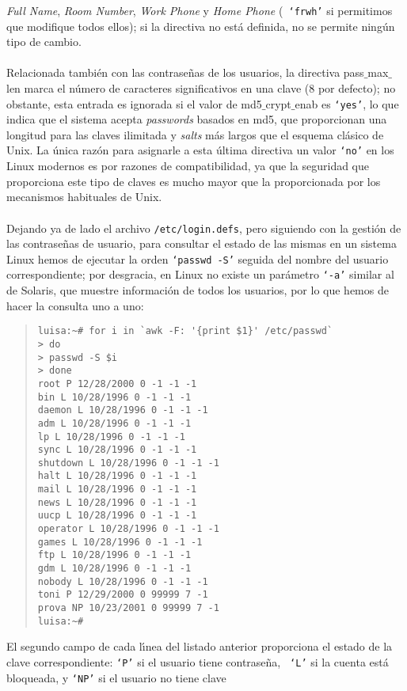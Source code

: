 {\it Full Name}, {\it Room Number}, {\it Work Phone} y {\it Home Phone} ({\tt 
`frwh'} si permitimos que modifique todos ellos); si la directiva no est\'a
definida, no se permite ning\'un tipo de cambio.\\
\\Relacionada tambi\'en con las contrase\~nas de los usuarios, la directiva {\sc
pass$\_$max$\_$len} marca el n\'umero de caracteres significativos en una clave
(8 por defecto); no obstante, esta entrada es ignorada si el valor de {\sc
md5$\_$crypt$\_$enab} es {\tt `yes'}, lo que indica que el sistema acepta {\it
passwords} basados en {\sc md5}, que proporcionan una longitud para las claves
ilimitada y {\it salts} m\'as largos que el esquema cl\'asico de Unix. La 
\'unica raz\'on para asignarle a esta \'ultima directiva un valor {\tt `no'} en
los Linux modernos es por razones de compatibilidad, ya que la seguridad que
proporciona este tipo de claves es mucho mayor que la proporcionada por los
mecanismos habituales de Unix.\\
\\Dejando ya de lado el archivo {\tt /etc/login.defs}, pero siguiendo con la
gesti\'on de las contrase\~nas de usuario, para consultar el estado de las 
mismas en un sistema Linux 
hemos de ejecutar la orden {\tt `passwd -S'} seguida del nombre del usuario 
correspondiente; por desgracia, en Linux no existe un par\'ametro {\tt `-a'} 
similar al de Solaris, que muestre informaci\'on de todos los usuarios, por lo
que hemos de hacer la consulta uno a uno:
\begin{quote}
\begin{verbatim}
luisa:~# for i in `awk -F: '{print $1}' /etc/passwd`
> do
> passwd -S $i
> done
root P 12/28/2000 0 -1 -1 -1
bin L 10/28/1996 0 -1 -1 -1
daemon L 10/28/1996 0 -1 -1 -1
adm L 10/28/1996 0 -1 -1 -1
lp L 10/28/1996 0 -1 -1 -1
sync L 10/28/1996 0 -1 -1 -1
shutdown L 10/28/1996 0 -1 -1 -1
halt L 10/28/1996 0 -1 -1 -1
mail L 10/28/1996 0 -1 -1 -1
news L 10/28/1996 0 -1 -1 -1
uucp L 10/28/1996 0 -1 -1 -1
operator L 10/28/1996 0 -1 -1 -1
games L 10/28/1996 0 -1 -1 -1
ftp L 10/28/1996 0 -1 -1 -1
gdm L 10/28/1996 0 -1 -1 -1
nobody L 10/28/1996 0 -1 -1 -1
toni P 12/29/2000 0 99999 7 -1
prova NP 10/23/2001 0 99999 7 -1
luisa:~# 
\end{verbatim}
\end{quote}
El segundo campo de cada l\'{\i}nea del listado anterior proporciona el estado 
de la clave correspondiente: {\tt `P'} si el usuario tiene contrase\~na, {\tt 
`L'} si la cuenta est\'a bloqueada, y {\tt `NP'} si el usuario no tiene clave 
